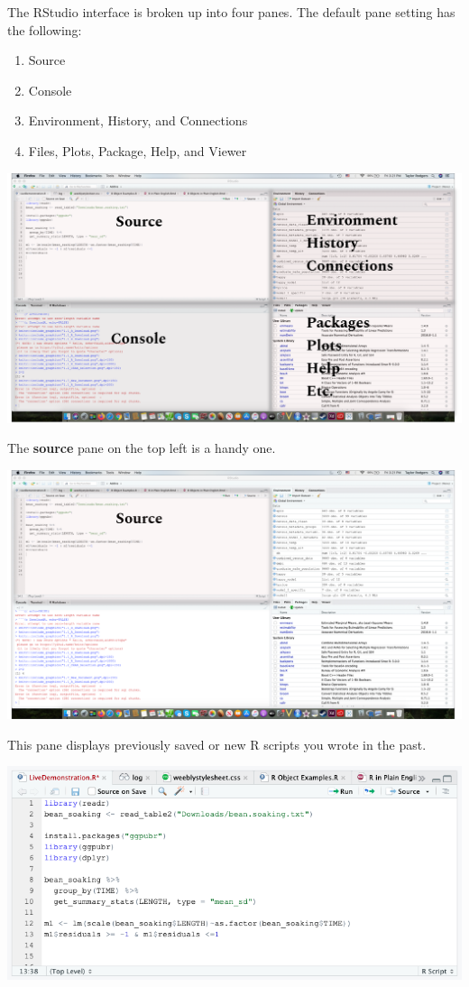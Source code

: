 \documentclass[
]{book}
\providecommand{\tightlist}{%
  \setlength{\itemsep}{0pt}\setlength{\parskip}{0pt}}
\begin{document}
The RStudio interface is broken up into four panes. The default pane setting has the following:

\begin{enumerate}
\def\labelenumi{\arabic{enumi}.}
\tightlist
\item
  Source
\item
  Console
\item
  Environment, History, and Connections
\item
  Files, Plots, Package, Help, and Viewer
\end{enumerate}

\begin{center}\includegraphics[width=0.75\linewidth]{1.12_RStudio_Labels} \end{center}

The \textbf{source} pane on the top left is a handy one.

\begin{center}\includegraphics[width=0.75\linewidth]{1.13_RStudio_Source} \end{center}

This pane displays previously saved or new R scripts you wrote in the past.

\begin{center}\includegraphics[width=0.75\linewidth]{1.14_Saved_Script} \end{center}
\end{document}
